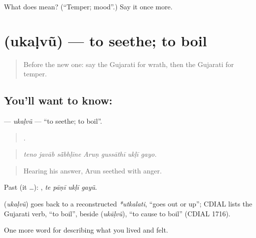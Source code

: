 \begin{tcolorbox}[breakable,colback=teal!4,colframe=teal!35!black,title={Before you move on}]
What does  mean? (\textquotedblleft{}Temper; mood\textquotedblright{}.) Say it once more.
\end{tcolorbox}
\section[\texorpdfstring{\gu{ઉકળવું} (ukaḷvũ)}{ઉકળવું (ukaḷvũ)}]{ (ukaḷvũ) — to seethe; to boil}

\label{lesson:GU-C452-ukalvu-seethe}



\begin{quote}
Before the new one: say the Gujarati for wrath, then the Gujarati for temper.
\end{quote}

\subsection*{You'll want to know: }
\textbf{} — \emph{ukaḷvũ} — \textquotedblleft{}to seethe; to boil\textquotedblright{}.

\begin{quote}
      .
\end{quote}

\begin{quote}
\emph{teno javāb sā̃bhḷīne Aruṇ gussāthī ukḷī gayo.}
\end{quote}

\begin{quote}
Hearing his answer, Arun seethed with anger.
\end{quote}

Past (it …):    , \emph{te pāṇī ukḷī gayũ}.

\begin{cousinweb}
\textbf{} (\emph{ukaḷvũ}) goes back to a reconstructed \emph{*utkalati}, \textquotedblleft{}goes out or up\textquotedblright{}; CDIAL lists the Gujarati verb, \textquotedblleft{}to boil\textquotedblright{}, beside \textbf{} (\emph{ukāḷvũ}), \textquotedblleft{}to cause to boil\textquotedblright{} (CDIAL 1716).
\end{cousinweb}

\begin{grammarlens}[title={What you've built}]
One more word for describing what you lived and felt.
\end{grammarlens}

